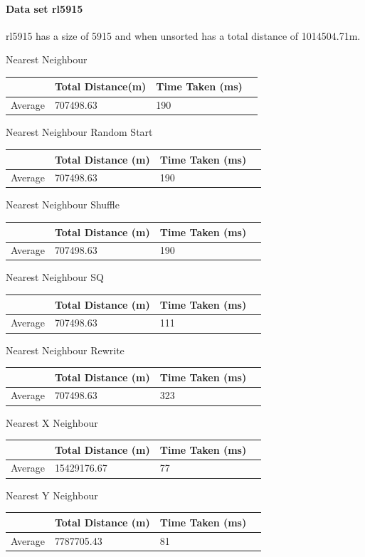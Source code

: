 \documentclass[conference,backref=page]{acmsiggraph}
\begin{document}
\paragraph{Data set rl5915} \hfill

rl5915 has a size of 5915 and when unsorted has a total distance of 1014504.71m.

\begin{center}	
	
	Nearest Neighbour
	\begin{tabular}{| l | l | l | l |}
		\hline
		& Total Distance(m)& Time Taken (ms)\\ \hline
		Average & 707498.63 & 190 \\ \hline
	\end{tabular}
	
	Nearest Neighbour Random Start
	\begin{tabular}{| l | l | l | l |}
		\hline
		& Total Distance (m) & Time Taken (ms)\\ \hline
		Average & 707498.63 & 190 \\ \hline
	\end{tabular}
	
	Nearest Neighbour Shuffle
	\begin{tabular}{| l | l | l | l |}
		\hline
		& Total Distance (m) & Time Taken (ms)\\ \hline
		Average & 707498.63 & 190 \\ \hline
	\end{tabular}
	
	Nearest Neighbour SQ
	\begin{tabular}{| l | l | l | l |}
		\hline
		& Total Distance (m) & Time Taken (ms)\\ \hline
		Average & 707498.63 & 111 \\ \hline
	\end{tabular}
	
	Nearest Neighbour Rewrite
	\begin{tabular}{| l | l | l | l |}
		\hline
		& Total Distance (m) & Time Taken (ms)\\ \hline
		Average & 707498.63 & 323 \\ \hline
	\end{tabular}
	
	
	Nearest X Neighbour	
	\begin{tabular}{| l | l | l | l |}
		\hline
		& Total Distance (m) & Time Taken (ms)\\ \hline
		Average & 15429176.67 & 77 \\ \hline	
	\end{tabular}
	
	Nearest Y Neighbour	
	\begin{tabular}{| l | l | l | l |}
		\hline
		& Total Distance (m) & Time Taken (ms)\\ \hline
		Average & 7787705.43 & 81 \\ \hline
	\end{tabular}
\end{center}
\end{document}
